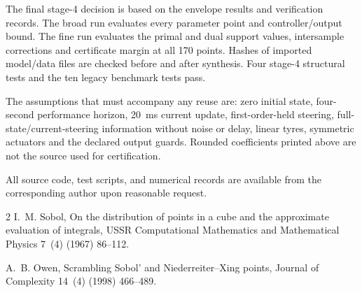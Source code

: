 \documentclass[10pt,a4paper]{article}
\begin{document}
The final stage-4 decision is based on the envelope results and verification records. The broad run evaluates every parameter point and controller/output bound. The fine run evaluates the primal and dual support values, intersample corrections and certificate margin at all 170 points. Hashes of imported model/data files are checked before and after synthesis. Four stage-4 structural tests and the ten legacy benchmark tests pass.

The assumptions that must accompany any reuse are: zero initial state, four-second performance horizon, \SI{20}{ms} current update, first-order-held steering, full-state/current-steering information without noise or delay, linear tyres, symmetric actuators and the declared output guards. Rounded coefficients printed above are not the source used for certification.

All source code, test scripts, and numerical records are available from the corresponding author upon reasonable request.

\begin{thebibliography}{2}
I.~M. Sobol, On the distribution of points in a cube and the approximate evaluation of integrals, USSR Computational Mathematics and Mathematical Physics 7~(4) (1967) 86--112.

A.~B. Owen, Scrambling Sobol' and Niederreiter--Xing points, Journal of Complexity 14~(4) (1998) 466--489.
\end{thebibliography}
\end{document}

